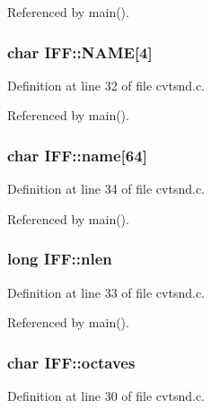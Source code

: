 Referenced by main().

\hypertarget{structIFF_a34b56f8aa93d422392b6b8d18e68062c}{
\subsubsection[{N\+A\+M\+E}]{\setlength{\rightskip}{0pt plus 5cm}char I\+F\+F\+::\+N\+A\+M\+E\mbox{[}4\mbox{]}}}\label{structIFF_a34b56f8aa93d422392b6b8d18e68062c}


Definition at line 32 of file cvtsnd.\+c.



Referenced by main().

\hypertarget{structIFF_a822828c4ace3714efd1a34b9b3e424b8}{
\subsubsection[{name}]{\setlength{\rightskip}{0pt plus 5cm}char I\+F\+F\+::name\mbox{[}64\mbox{]}}}\label{structIFF_a822828c4ace3714efd1a34b9b3e424b8}


Definition at line 34 of file cvtsnd.\+c.



Referenced by main().

\hypertarget{structIFF_a857a1987197e51123f22cc81fd32b02a}{
\subsubsection[{nlen}]{\setlength{\rightskip}{0pt plus 5cm}long I\+F\+F\+::nlen}}\label{structIFF_a857a1987197e51123f22cc81fd32b02a}


Definition at line 33 of file cvtsnd.\+c.



Referenced by main().

\hypertarget{structIFF_aa6549566463bd447a6a7bf1204646d52}{
\subsubsection[{octaves}]{\setlength{\rightskip}{0pt plus 5cm}char I\+F\+F\+::octaves}}\label{structIFF_aa6549566463bd447a6a7bf1204646d52}


Definition at line 30 of file cvtsnd.\+c.



